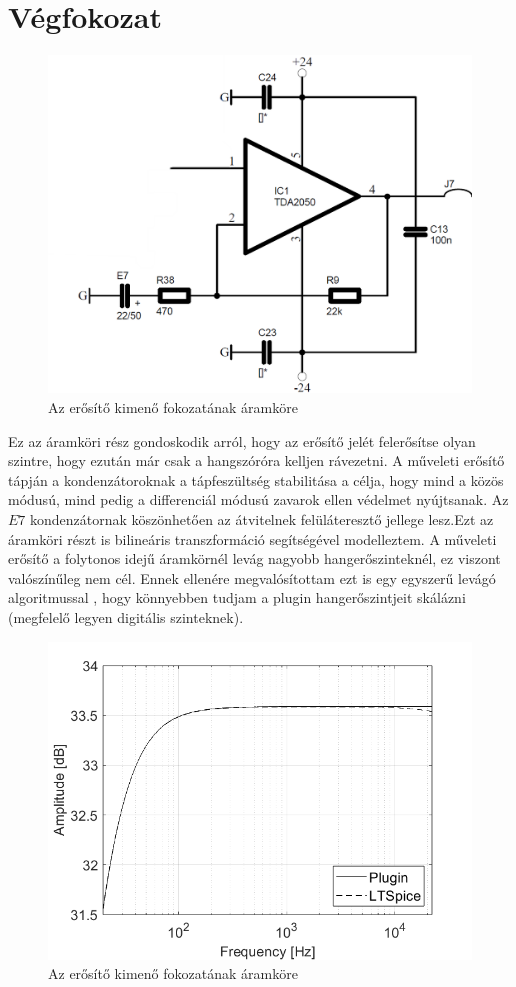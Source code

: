\section{Végfokozat}
\begin{figure}[H]
    \centering
    \includegraphics[scale=0.35]{figures/stage8.png}
    \caption{Az erősítő kimenő fokozatának áramköre}
\end{figure}
Ez az áramköri rész gondoskodik arról, hogy az erősítő jelét felerősítse olyan szintre, hogy ezután már csak a hangszóróra kelljen rávezetni. A műveleti erősítő tápján a kondenzátoroknak a tápfeszültség stabilitása a célja, hogy mind a közös módusú, mind pedig a differenciál módusú zavarok ellen védelmet nyújtsanak. Az $E7$ kondenzátornak köszönhetően az átvitelnek felüláteresztő jellege lesz.Ezt az áramköri részt is bilineáris transzformáció segítségével modelleztem. A műveleti erősítő a folytonos idejű áramkörnél levág nagyobb hangerőszinteknél, ez viszont valószínűleg nem cél. Ennek ellenére megvalósítottam ezt is egy egyszerű levágó algoritmussal \cite{opampo}, hogy könnyebben tudjam a plugin hangerőszintjeit skálázni (megfelelő legyen digitális szinteknek).
\begin{figure}[H]
    \centering
    \includegraphics[scale=0.5]{figures/stage8ac.png}
    \caption{Az erősítő kimenő fokozatának áramköre}
\end{figure}
